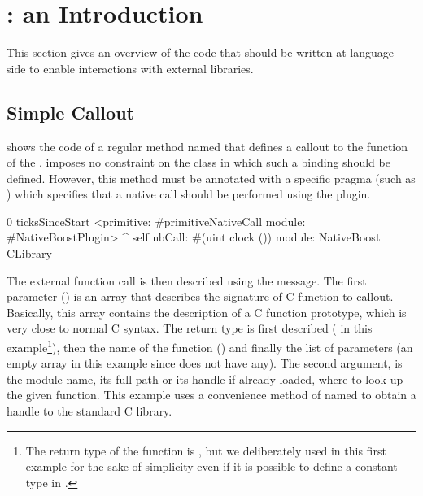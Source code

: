 

\section{\NBFFI: an Introduction}

This section gives an overview of the code that should be written at language-side
to enable interactions with external libraries.


\subsection{Simple Callout}

 shows the code of a regular \ST method named  that defines a callout to the  function of the .
\NB imposes no constraint on the class in which such a binding should be defined.
However, this method must be annotated with a specific pragma (such as ) which specifies that a native call should be performed using the \NB plugin.

\begin{stcode}[
	label={lst:ffi-clock},
	caption={\NBFFI example of callout declaration to the \ttt{clock} function of the \ttt{libc}}]{0}
ticksSinceStart
	<primitive: #primitiveNativeCall
	 module: #NativeBoostPlugin>
	^ self
		nbCall: #(uint clock ())
		module: NativeBoost CLibrary
\end{stcode}

The external function call is then described using the  message.
The first parameter () is an array that describes the signature of C function to callout.
Basically, this array contains the description of a C function prototype, which is very close to normal C syntax.
The return type is first described ( in this example\footnote{The return type of the  function is , but we deliberately used  in this first example for the sake of simplicity even if it is possible to define a constant type in \NB.}), then the name of the function () and finally the list of parameters (an empty array in this example since  does not have any).
The second argument,  is the module name, its full path or its handle if already loaded, where to look up the given function.
This example uses a convenience method of \NB named  to obtain a handle to the standard C library.

